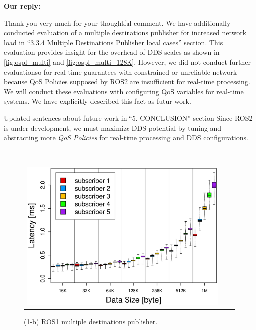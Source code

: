 \documentclass{article}
\begin{document}
\begin{enumerate}
  \begin{flushleft}
    \textbf{Our reply:}
  \end{flushleft}
  Thank you very much for your thoughtful comment.
  We have additionally conducted evaluation of a multiple destinations publisher for increased network load in ``3.3.4 Multiple Destinations Publisher local cases'' section.
  This evaluation provides insight for the overhead of DDS scales as shown in \ref{fig:ospl_multi} and \ref{fig:ospl_multi_128K}.
  However, we did not conduct further evaluationso for real-time guarantees with constrained or unreliable network because QoS Policies supposed by ROS2 are insufficient for real-time processing.
  We will conduct these evaluations with configuring QoS variables for real-time systems.
  We have explicitly described this fact as futur work.
  \begin{itembox}[|]{Updated sentences about future work in ``5. CONCLUSION'' section}
    Since ROS2 is under development, we must maximize DDS potential by tuning and abstracting more \emph{QoS Policies} for real-time processing and DDS configurations.
  \end{itembox}\\
  \setcounter{figure}{15}
  \begin{figure}[h]
    \begin{tabular}{ccc}
      \begin{minipage}[t]{0.31\textwidth}
        \includegraphics[width=1.0\linewidth]{../../figure/BoxPlot_ros1_1M_multi-pub5.eps}
        \caption{(1-b) ROS1 multiple destinations publisher.}
        \label{fig:ros1_multi}
      \end{minipage}

\end{tabular}
\end{figure}
\end{enumerate}
\end{document}
